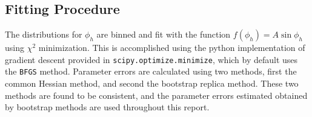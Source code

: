 \subsection{Fitting Procedure}
The distributions for $\phi_h$ are binned and fit with the function $f(\phi_h) = A\sin{\phi_h}$ using $\chi^2$ minimization.  This is accomplished using the python implementation of gradient descent provided in \texttt{scipy.optimize.minimize}, which by default uses the \texttt{BFGS} method.  Parameter errors are calculated using two methods, first the common Hessian method, and second the bootstrap replica method.  These two methods are found to be consistent, and the parameter errors estimated obtained by bootstrap methods are used throughout this report.   
\\    

